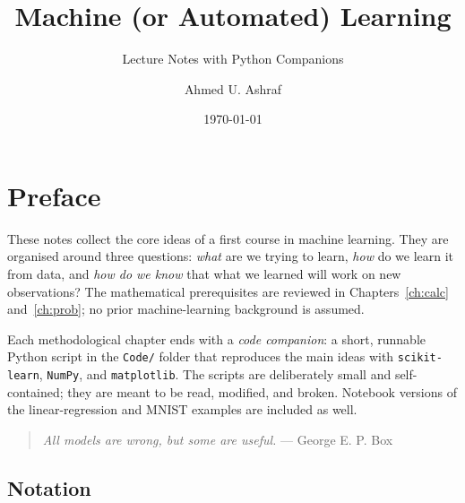 \documentclass[a4paper, 12pt]{book}
\title{Machine (or Automated) Learning}
\subtitle{Lecture Notes with Python Companions}
\author{Ahmed U. Ashraf}
\date{\today}
\begin{document}
\frontmatter
\maketitle
\makeatletter
\let\hypercontentsline=\contentsline
\renewcommand{\contentsline}[4]{%
  \hypertarget{toc.#4}{}\hypercontentsline{#1}{#2}{#3}{#4}}
\makeatother
\tableofcontents\label{toc}

\chapter*{Preface}

These notes collect the core ideas of a first course in machine learning. They are
organised around three questions: \emph{what} are we trying to learn, \emph{how} do
we learn it from data, and \emph{how do we know} that what we learned will work on
new observations? The mathematical prerequisites are reviewed in
Chapters~\ref{ch:calc} and~\ref{ch:prob}; no prior machine-learning background is
assumed.

Each methodological chapter ends with a \emph{code companion}: a short, runnable
Python script in the \texttt{Code/} folder that reproduces the main ideas with
\texttt{scikit-learn}, \texttt{NumPy}, and \texttt{matplotlib}. The scripts are
deliberately small and self-contained; they are meant to be read, modified, and
broken. Notebook versions of the linear-regression and MNIST examples are included
as well.

\begin{quote}
\emph{All models are wrong, but some are useful.} --- George E. P. Box
\end{quote}

\section*{Notation}
\end{document}
